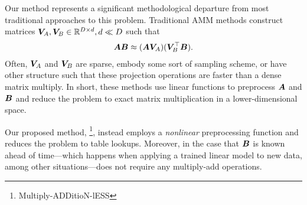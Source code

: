 
Our method represents a significant methodological departure from most traditional approaches to this problem. Traditional AMM methods construct matrices $\bm{V}_A, \bm{V}_B \in \mathbb{R}^{D \times d}, d \ll D$ such that
\begin{align}
    \bm{A} \bm{B} \approx (\bm{A} \bm{V}_A) (\bm{V}_B^\top \bm{B}).
\end{align}
Often, $\bm{V}_A$ and $\bm{V}_B$ are sparse, embody some sort of sampling scheme, or have other structure such that these projection operations are faster than a dense matrix multiply. In short, these methods use linear functions to preprocess $\bm{A}$ and $\bm{B}$ and reduce the problem to exact matrix multiplication in a lower-dimensional space.

Our proposed method, \ours\footnote{Multiply-ADDitioN-lESS}, instead employs a \textit{nonlinear} preprocessing function and reduces the problem to table lookups. Moreover, in the case that $\bm{B}$ is known ahead of time---which happens when applying a trained linear model to new data, among other situations---\oursp does not require any multiply-add operations.







